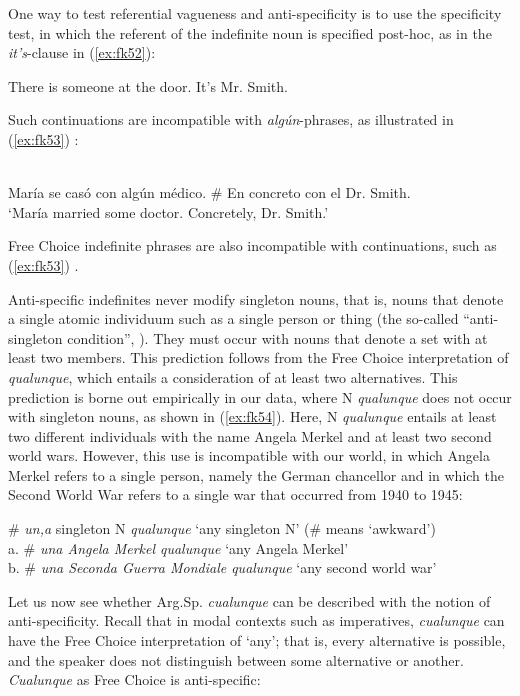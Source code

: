 \documentclass[output=paper,colorlinks,citecolor=brown]{langscibook}
\begin{document}
One way to test referential vagueness and anti-specificity is to use the specificity test, in which the referent of the indefinite noun is specified post-hoc, as in the \textit{it’s}-clause in (\ref{ex:fk52}):

\ea \label{ex:fk52}
    There is someone at the door. It’s Mr. Smith. 
\z

Such continuations are incompatible with \textit{algún}-phrases, as illustrated in (\ref{ex:fk53}) \citep[see][]{Menéndez-Benito2010, Alonso-OvalleMenéndez-Benito2010}:

\ea \label{ex:fk53}\citep[36]{Alonso-OvalleMenéndez-Benito2013}\\
    María se casó con algún médico. \# En concreto con el Dr. Smith.\\
    ‘María married some doctor. Concretely, Dr. Smith.’
\z

Free Choice indefinite phrases are also incompatible with continuations, such as (\ref{ex:fk53}) \citep[see][]{Chierchia2006, JayezTovena2007, Falaus2014}.

Anti-specific indefinites never modify singleton nouns, that is, nouns that denote a single atomic individuum such as a single person or thing (the so-called “anti-singleton condition”, \cite[cf.][]{Menéndez-Benito2010}). They must occur with nouns that denote a set with at least two members. This prediction follows from the Free Choice interpretation of \textit{qualunque}, which entails a consideration of at least two alternatives. This prediction is borne out empirically in our data, where N \textit{qualunque} does not occur with singleton nouns, as shown in (\ref{ex:fk54}). Here, N \textit{qualunque} entails at least two different individuals with the name Angela Merkel and at least two second world wars. However, this use is incompatible with our world, in which Angela Merkel refers to a single person, namely the German chancellor and in which the Second World War refers to a single war that occurred from 1940 to 1945:

\ea \label{ex:fk54}
    \# \textit{un,a} singleton N \textit{qualunque} ‘any singleton N’ (\# means ‘awkward’)\\
        a. \# \textit{una Angela Merkel qualunque} ‘any Angela Merkel’\\
        b. \# \textit{una Seconda Guerra Mondiale qualunque} ‘any second world war’\\
\z

Let us now see whether Arg.Sp. \textit{cualunque} can be described with the notion of anti-specificity. Recall that in modal contexts such as imperatives, \textit{cualunque} can have the Free Choice interpretation of ‘any’; that is, every alternative is possible, and the speaker does not distinguish between some alternative or another. \textit{Cualunque} as Free Choice is anti-specific:
\end{document}
